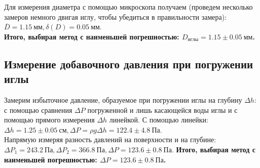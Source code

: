 \documentclass[a4paper, 12pt]{article}%
\begin{document}
		Для измерения диаметра с помощью микроскопа получаем (проведем несколько замеров немного двигая иглу, чтобы убедиться в правильности замера): $\overline{D} = 1.15~ мм, \delta(D)=0.05~мм$.\\
	\textbf{Итого, выбирая метод с наименьшей погрешностью: $D_{иглы}=1.15\pm 0.05 ~мм$.}
	\subsection{Измерение добавочного давления при погружении иглы}
	Замерим избыточное давление, образуемое при погружении иглы на глубину $\Delta h$: с помощью сравнения $\Delta P$ погруженной и лишь касающейся воды иглы и с помощью прямого измерения $\Delta h$ линейкой.\newline
	С помощью линейки: $\Delta h = 1.25\pm 0.05 ~см, \Delta P = \rho g \Delta h = 122.4\pm4.8~ Па$.\\
	Напрямую измеряя разность давлений на поверхности и на глубине: \newline
	$\Delta P_{1} = 243.2~Па, \Delta P_{2} = 366.8 ~Па, \Delta P = 123.6\pm 0.8~Па$.\newline
	\textbf{Итого, выбирая метод с наименьшей погрешностью: $\Delta P = 123.6\pm 0.8~Па$.}
\end{document}
